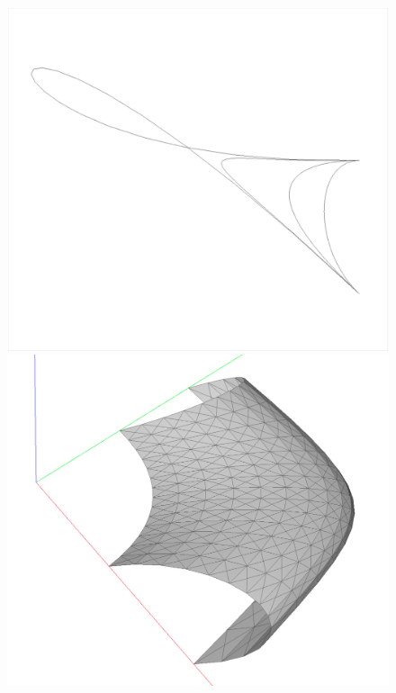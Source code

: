 \begin{coding}[Algebraic computation of FE = $\delta_1$]
{\begin{figure}[htbp] %
	\begin{minipage}[c]{0.5\linewidth}
   	\includegraphics[width=\linewidth,height=0.87\linewidth]{chapter-05/figs/hermitecurves.pdf}%
	\end{minipage}%
	\begin{minipage}[c]{0.5\linewidth}
   	\includegraphics[width=\linewidth]{chapter-05/figs/trasfinitehermite.pdf}%
	\end{minipage}%


\end{figure}}
\end{coding}
